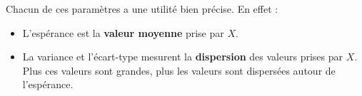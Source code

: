 	Chacun de ces paramètres a une utilité bien précise. En effet :
	
	\begin{formula}
		\begin{itemize}
			\item L'espérance est la \textbf{valeur moyenne} prise par $X$.
			\item La variance et l'écart-type mesurent la \textbf{dispersion} des valeurs prises par $X$. Plus ces valeurs sont grandes, plus les valeurs sont dispersées autour de l'espérance.
		\end{itemize}
	\end{formula}
